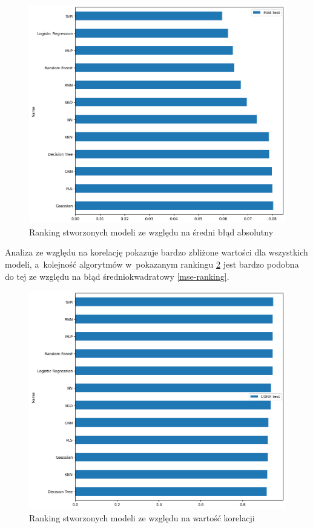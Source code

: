 \begin{figure}[H]
    \centering
    \includegraphics[width=\textwidth]{images/mae_ranking.png}
    \caption[Ranking ze względu na MAE]{Ranking stworzonych modeli ze względu na średni błąd absolutny}
    \label{mae-ranking}
\end{figure}

Analiza ze względu na korelację pokazuje bardzo zbliżone wartości dla wszystkich 
modeli, a~kolejność algorytmów w~pokazanym rankingu \ref{corr-ranking} jest 
bardzo podobna do tej ze względu na błąd średniokwadratowy \ref{mse-ranking}.

\begin{figure}[H]
    \centering
    \includegraphics[width=\textwidth]{images/corr_ranking.png}
    \caption[Ranking ze względu na korelację]{Ranking stworzonych modeli ze względu na wartość korelacji}
    \label{corr-ranking}
\end{figure}

